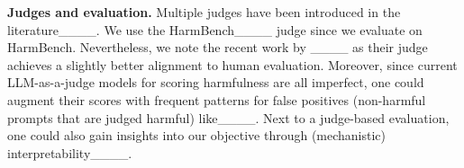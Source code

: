\textbf{Judges and evaluation.} Multiple judges have been introduced in the literature____. We use the HarmBench____ judge since we evaluate on HarmBench. Nevertheless, we note the recent work by ____ as their judge achieves a slightly better alignment to human evaluation. Moreover, since current LLM-as-a-judge models for scoring harmfulness are all imperfect, one could augment their scores with frequent patterns for false positives (non-harmful prompts that are judged harmful) like____. Next to a judge-based evaluation, one could also gain insights into our objective through (mechanistic) interpretability____.
